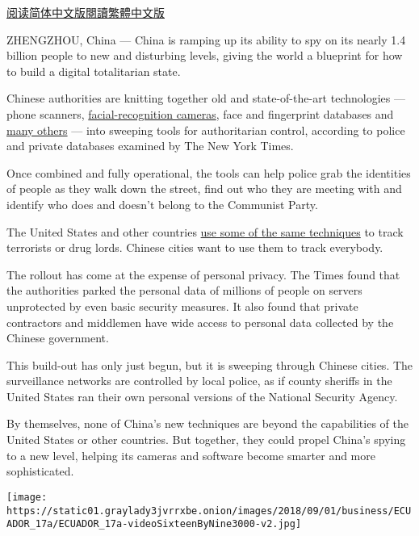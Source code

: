 \href{https://cn.nytimes3xbfgragh.onion/technology/20191219/china-surveillance/}{阅读简体中文版}\href{https://cn.nytimes3xbfgragh.onion/technology/20191219/china-surveillance/zh-hant}{閱讀繁體中文版}

ZHENGZHOU, China --- China is ramping up its ability to spy on its
nearly 1.4 billion people to new and disturbing levels, giving the world
a blueprint for how to build a digital totalitarian state.

Chinese authorities are knitting together old and state-of-the-art
technologies --- phone scanners,
\href{https://www.nytimes3xbfgragh.onion/2018/07/08/business/china-surveillance-technology.html}{facial-recognition
cameras}, face and fingerprint databases and
\href{https://www.nytimes3xbfgragh.onion/2019/07/02/technology/china-xinjiang-app.html}{many
others} --- into sweeping tools for authoritarian control, according to
police and private databases examined by The New York Times.

Once combined and fully operational, the tools can help police grab the
identities of people as they walk down the street, find out who they are
meeting with and identify who does and doesn't belong to the Communist
Party.

The United States and other countries
\href{https://www.nytimes3xbfgragh.onion/2015/07/25/world/europe/france-clears-final-hurdle-to-expand-spying-power.html}{use
some of the same techniques} to track terrorists or drug lords. Chinese
cities want to use them to track everybody.

The rollout has come at the expense of personal privacy. The Times found
that the authorities parked the personal data of millions of people on
servers unprotected by even basic security measures. It also found that
private contractors and middlemen have wide access to personal data
collected by the Chinese government.

This build-out has only just begun, but it is sweeping through Chinese
cities. The surveillance networks are controlled by local police, as if
county sheriffs in the United States ran their own personal versions of
the National Security Agency.

By themselves, none of China's new techniques are beyond the
capabilities of the United States or other countries. But together, they
could propel China's spying to a new level, helping its cameras and
software become smarter and more sophisticated.

\texttt{[image: https://static01.graylady3jvrrxbe.onion/images/2018/09/01/business/ECUADOR\_17a/ECUADOR\_17a-videoSixteenByNine3000-v2.jpg]}

